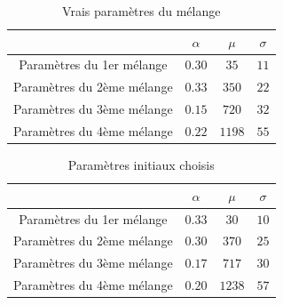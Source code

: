 \documentclass[a4paper,french,10pt]{article}
\begin{document}
\begin{table}[htp]
	\center
	\begin{tabular}{|c||c|c|c|}
		\hline
		& $\alpha$ & $\mu$ & $\sigma$\\
		\hline
		Paramètres du 1er mélange & $0.30$ & $35$ & $11$ \\
		\hline
		Paramètres du 2ème mélange & $0.33$ & $350$ & $22$ \\
		\hline
		Paramètres du 3ème mélange & $0.15$ & $720$ & $32$ \\
		\hline
		Paramètres du 4ème mélange & $0.22$ & $1198$ & $55$ \\
		\hline
	\end{tabular}
	\caption{Vrais paramètres du mélange}
	\label{tab3}
\end{table}

\begin{table}[htp]
	\center
	\begin{tabular}{|c||c|c|c|}
		\hline
		& $\alpha$ & $\mu$ & $\sigma$\\
		\hline
		Paramètres du 1er mélange & $0.33$ & $30$ & $10$ \\
		\hline
		Paramètres du 2ème mélange & $0.30$ & $370$ & $25$ \\
		\hline
		Paramètres du 3ème mélange & $0.17$ & $717$ & $30$ \\
		\hline
		Paramètres du 4ème mélange & $0.20$ & $1238$ & $57$ \\
		\hline
	\end{tabular}
	\caption{Paramètres initiaux choisis}
	\label{tab4}
\end{table}

\end{document}
